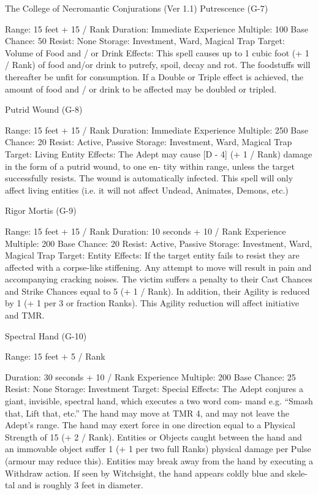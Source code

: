 \begin{Chapter}{The College of Necromantic Conjurations (Ver 1.1)}
Putrescence (G-7) 

Range: 15 feet + 15 / Rank 
Duration: Immediate 
Experience Multiple: 100 
Base Chance: 50%
Resist: None 
Storage: Investment, Ward, Magical Trap 
Target: Volume of Food and / or Drink 
Effects: This spell causes up to 1 cubic foot (+ 1 / 
Rank) of food and/or drink to putrefy, spoil, decay 
and  rot.  The  foodstuffs  will  thereafter  be  unfit  for 
consumption.  If  a  Double  or  Triple  effect  is 
achieved,  the  amount  of  food  and  /  or  drink  to  be 
affected may be doubled or tripled. 

Putrid Wound (G-8) 

Range: 15 feet + 15 / Rank 
Duration: Immediate 
Experience Multiple: 250 
Base Chance: 20%
Resist: Active, Passive 
Storage: Investment, Ward, Magical Trap 
Target: Living Entity 
Effects: The Adept may cause [D - 4] (+ 1 / Rank) 
damage  in  the  form of  a  putrid  wound,  to  one  en-
tity  within  range,  unless  the  target  successfully 
resists.  The  wound  is  automatically  infected.  This 
spell  will  only affect living entities (i.e. it will not 
affect Undead, Animates, Demons, etc.) 

Rigor Mortis (G-9) 

Range: 15 feet + 15 / Rank 
Duration: 10 seconds + 10 / Rank 
Experience Multiple: 200 
Base Chance: 20%
Resist: Active, Passive 
Storage: Investment, Ward, Magical Trap 
Target: Entity 
Effects:  If  the  target  entity  fails  to  resist  they  are 
affected with a corpse-like stiffening. Any attempt 
to  move  will  result  in  pain  and  accompanying 
cracking  noises.  The  victim  suffers  a  penalty  to 
their  Cast  Chances  and  Strike  Chances  equal  to  5 
(+  1  /  Rank).  In  addition,  their  Agility  is  reduced 
by  1  (+  1  per  3  or  fraction  Ranks).  This  Agility 
reduction will affect initiative and TMR. 

Spectral Hand (G-10) 

Range: 15 feet + 5 / Rank 

Duration: 30 seconds + 10 / Rank 
Experience Multiple: 200 
Base Chance: 25%
Resist: None 
Storage: Investment 
Target: Special 
Effects:  The  Adept  conjures  a  giant,  invisible, 
spectral  hand,  which  executes  a  two  word  com-
mand  e.g.  “Smash  that,  Lift  that,  etc.”  The  hand 
may  move  at  TMR  4,  and  may  not  leave  the 
Adept’s  range.  The  hand  may  exert  force  in  one 
direction  equal  to  a  Physical  Strength  of  15  (+ 2  / 
Rank). Entities or Objects caught between the hand 
and an immovable object suffer 1 (+ 1 per two full 
Ranks)  physical  damage  per  Pulse  (armour  may 
reduce  this).  Entities  may  break  away  from  the 
hand  by  executing  a  Withdraw  action.  If  seen  by 
Witchsight, the hand appears coldly blue and skele-
tal and is roughly 3 feet in diameter. 


\end{Chapter}
